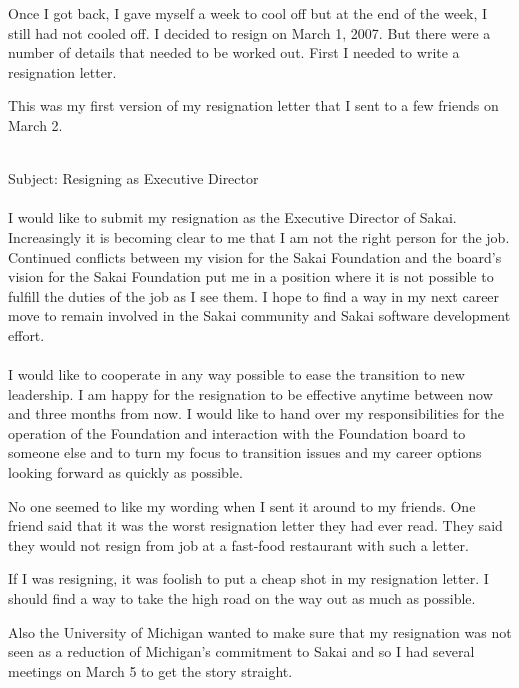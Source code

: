 \documentclass[12pt]{book}
\begin{document}
Once I got back, I gave myself a week to cool off but at the end of the week,
I still had not cooled off.  I decided to resign on March 1, 2007.  But there were a
number of details that needed to be worked out.   First I needed to write a resignation
letter.

This was my first version of my resignation letter that I sent to a few friends
on March 2.\\
\\
\begin{sf}
Subject: Resigning as Executive Director\\
\\
I would like to submit my resignation as the Executive Director of
Sakai.  Increasingly it is becoming clear to me that I am not the
right person for the job.  Continued conflicts between my vision
for the Sakai Foundation and the board's vision for the Sakai
Foundation put me in a position where it is not possible to fulfill
the duties of the job as I see them.  I hope to find a way in
my next career move to remain involved in the Sakai community and
Sakai software development effort.\\
\\
I would like to cooperate in any way possible to ease the transition to
new leadership.  I am happy for the resignation to be effective
anytime between now and three months from now.  I would like to hand
over my responsibilities for the operation of the Foundation and
interaction with the Foundation board to someone else and to turn
my focus to transition issues and my career options looking forward
as quickly as possible.\\
\end{sf}

No one seemed to like my wording when I sent it around to my friends.
One friend said that it was the
worst resignation letter they had ever read.  They said they
would not resign from job at a fast-food restaurant
with such a letter.

If I was resigning, it was foolish to put a cheap shot
in my resignation letter. I should find a way to take the high road
on the way out as much as possible.

Also the University of Michigan wanted to make sure that my resignation
was not seen as a reduction of Michigan's commitment to Sakai and
so I had several meetings on March 5 to get the story straight.
\end{document}
